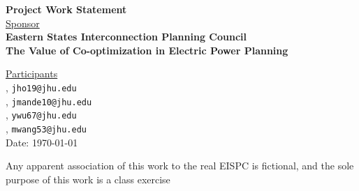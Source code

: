 \documentclass[12pt,letterpaper]{article}
\theoremstyle{definition}
\begin{document}
\def\shiftdowna{0.32in}  %
\def\shiftdownb{0.22in}  %


\begin{center}
\textbf{{\large Project Work Statement}}\\


\vspace \shiftdowna
\underline {Sponsor}\\ 
\vspace{5pt}
\textbf{{\large Eastern States Interconnection Planning Council}}\\


\vspace \shiftdowna
\textbf{{\large The Value of Co-optimization in Electric Power Planning}}


\vspace{0.35in}
\vspace \shiftdownb
\underline {Participants} \\
\vspace{5pt}
, \texttt{jho19@jhu.edu}\\
\vspace{5pt}
, \texttt{jmande10@jhu.edu}\\
\vspace{5pt}
, \texttt{ywu67@jhu.edu}\\
\vspace{5pt}
, \texttt{mwang53@jhu.edu}\\

\vspace \shiftdowna
Date: \today

\end{center}

\vfill  
\footnoterule
\noindent \small{Any apparent association of this work to  the real EISPC is
fictional, and the sole purpose of this work is a class exercise}
\end{document}
